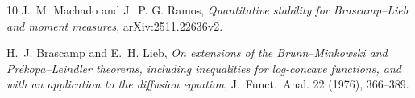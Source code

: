 \begin{thebibliography}{10}
J.~M. Machado and J.~P. G. Ramos,
\textit{Quantitative stability for Brascamp--Lieb and moment measures},
arXiv:2511.22636v2.

H.~J. Brascamp and E.~H. Lieb,
\textit{On extensions of the Brunn--Minkowski and Pr\'ekopa--Leindler theorems,
including inequalities for log-concave functions, and with an application to
the diffusion equation},
J.~Funct.~Anal. 22 (1976), 366--389.
\end{thebibliography}

